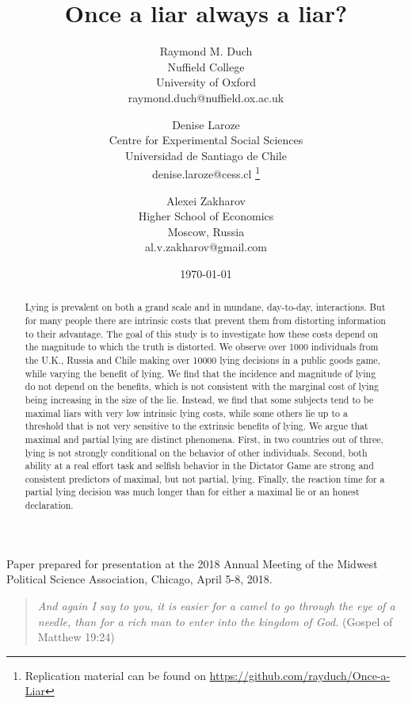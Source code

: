 \documentclass[12pt]{article}
\title{Once a liar always a liar?}
\author{
    Raymond M. Duch\\
    Nuffield College\\
    University of Oxford\\
    raymond.duch@nuffield.ox.ac.uk
  \and
    Denise Laroze\\
    Centre for Experimental Social Sciences\\
    Universidad de Santiago de Chile \\
    denise.laroze@cess.cl \thanks{Replication material can be found on \url{https://github.com/rayduch/Once-a-Liar}}
      \and
    Alexei Zakharov \\
    Higher School of Economics \\
    Moscow, Russia \\
    al.v.zakharov@gmail.com   
\vspace{0.5cm}
}
\date{\today}
\begin{document}
  \maketitle
  \vspace{4cm}
\begin{center}
Paper prepared for presentation at the 2018 Annual Meeting of the Midwest Political Science Association, Chicago, April 5-8, 2018.

\end{center}

\newpage

\begin{abstract}

Lying is prevalent on both a grand scale and in mundane, day-to-day, interactions. But for many people there are intrinsic costs that prevent them from distorting information to their advantage. The goal of this study is to investigate how these costs depend on the magnitude to which the truth is distorted. We observe over 1000 individuals from the U.K., Russia and Chile making over 10000 lying decisions in a public goods game, while varying the benefit of lying. We find that the incidence and magnitude of lying do not depend on the benefits, which is not consistent with the marginal cost of lying being increasing in the size of the lie. Instead, we find that some subjects tend to be maximal liars with very low intrinsic lying costs, while some others lie up to a threshold that is not very sensitive to the extrinsic benefits of lying. We argue that maximal and partial lying are distinct phenomena. First, in two countries out of three, lying is not strongly conditional on the behavior of other individuals. Second, both ability at a real effort task and selfish behavior in the Dictator Game are strong and consistent predictors of maximal, but not partial, lying. Finally, the reaction time for a partial lying decision was much longer than for either a maximal lie or an honest declaration. 

\end{abstract}
\doublespacing

\newpage

\begin{quotation}
{\it And again I say to you, it is easier for a camel to go through the eye of a needle, than for a rich man to enter into the kingdom of God.} (Gospel of Matthew 19:24)
\end{quotation}
\vspace{0.5cm}
\end{document}
